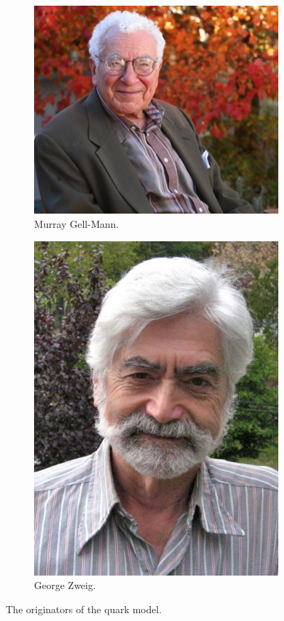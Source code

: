 \documentclass[a4paper]{amsbook}
\theoremstyle{definition}
\numberwithin{exercise}{chapter}
\numberwithin{exercise}{chapter}
\begin{document}
\begin{figure}
  \centering
  \begin{subfigure}{0.4\textwidth}
    \includegraphics[height=0.2\textheight]{gell-mann}
    \caption{Murray Gell-Mann. \label{fig:gell-mann}}
  \end{subfigure}\hfill%
  \begin{subfigure}{0.4\textwidth}
    \centering
    \includegraphics[height=0.2\textheight]{zweig}
    \caption{George Zweig. \label{fig:zweig}}
  \end{subfigure}
  \caption{The originators of the quark model. \label{fig:gmz}}
\end{figure}
\end{document}
